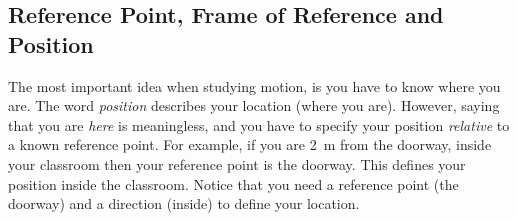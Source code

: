             \subsection*{Reference Point, Frame of Reference and Position}
            \nopagebreak
      \label{m38787*id62597}The most important idea when studying motion, is you have to know where you are. The word \textsl{position} describes your location (where you are). However, saying that you are \textsl{here} is meaningless, and you have to specify your position \textsl{relative} to a known reference point. For example, if you are 2~m from the doorway, inside your classroom then your reference point is the doorway. This defines your position inside the classroom. Notice that you need a reference point (the doorway) and a direction (inside) to define your location.\par 
      \label{m38787*uid4}
